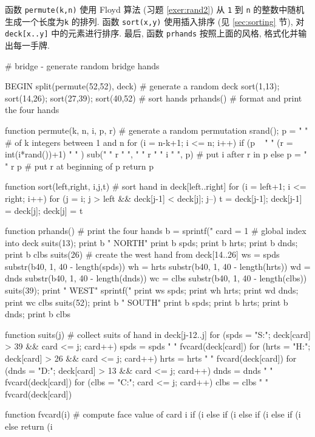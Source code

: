 函数 \texttt{permute(k,n)} 使用 Floyd 算法 (习题 \ref{exer:rand2}) 从
\texttt{1} 到 \texttt{n} 的整数中随机生成一个长度为\texttt{k} 的排列.
函数 \texttt{sort(x,y)} 使用插入排序 (见 \ref{sec:sorting} 节),
对 \texttt{deck[x..y]} 中的元素进行排序. 最后, 函数 \texttt{prhands} 
按照上面的风格, 格式化并输出每一手牌.
\begin{awkcode}
  # bridge - generate random bridge hands

  BEGIN { split(permute(52,52), deck)           # generate a random deck
          sort(1,13); sort(14,26); sort(27,39); sort(40,52) # sort hands
          prhands()                    # format and print the four hands
  }

  function permute(k, n,    i, p, r) {   # generate a random permutation
      srand(); p = " "                   # of k integers between 1 and n
      for (i = n-k+1; i <= n; i++)
          if (p ~ " " (r = int(i*rand())+1) " " )
              sub(" " r " ", " " r " " i " ", p)    # put i after r in p
          else p = " " r p                     # put r at beginning of p
      return p
  }

  function sort(left,right,    i,j,t) { # sort hand in deck[left..right]
      for (i = left+1; i <= right; i++)
          for (j = i; j > left && deck[j-1] < deck[j]; j--) {
              t = deck[j-1]; deck[j-1] = deck[j]; deck[j] = t
          }
  }

  function prhands() {                            # print the four hands
      b = sprintf("%
      card = 1                                  # global index into deck
      suits(13); print b "   NORTH"
      print b spds; print b hrts; print b dnds; print b clbs
      suits(26)  # create the west hand from deck[14..26]
      ws = spds substr(b40, 1, 40 - length(spds))
      wh = hrts substr(b40, 1, 40 - length(hrts))
      wd = dnds substr(b40, 1, 40 - length(dnds))
      wc = clbs substr(b40, 1, 40 - length(clbs))
      suits(39); print "   WEST" sprintf("%
      print ws spds; print wh hrts; print wd dnds; print wc clbs
      suits(52); print b "   SOUTH"
      print b spds; print b hrts; print b dnds; print b clbs
  }

  function suits(j) {           # collect suits of hand in deck[j-12..j]
      for (spds = "S:"; deck[card] > 39 && card <= j; card++)
          spds = spds " " fvcard(deck[card])
      for (hrts = "H:"; deck[card] > 26 && card <= j; card++)
          hrts = hrts " " fvcard(deck[card])
      for (dnds = "D:"; deck[card] > 13 && card <= j; card++)
          dnds = dnds " " fvcard(deck[card])
      for (clbs = "C:"; card <= j; card++)
          clbs = clbs " " fvcard(deck[card])
  }

  function fvcard(i) {                    # compute face value of card i
      if (i %
      else if (i %
      else if (i %
      else if (i %
      else return (i %
  }
\end{awkcode}

